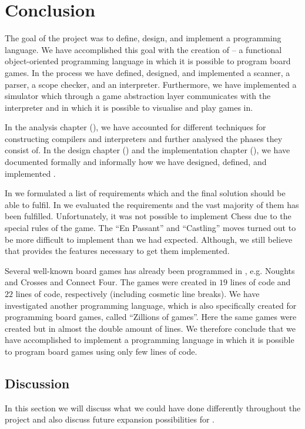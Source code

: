 \chapter{Conclusion}
\label{chap:conclusion}

The goal of the project was to define, design, and implement a programming
language.  We have accomplished this goal with the creation of \productname{} --
a functional object-oriented programming language in which it is possible to
program board games. In the process we have defined, designed, and implemented
a scanner, a parser, a scope checker, and an interpreter. Furthermore, we have
implemented a simulator which through a game abstraction layer communicates with
the interpreter and in which it is possible to visualise and play
\productname{} games in.

In the analysis chapter (), we have accounted for
different techniques for constructing compilers and interpreters and further
analysed the phases they consist of. In the design chapter
() and the implementation chapter
(), we have documented formally and informally how
we have designed, defined, and implemented \productname{}.

In  we formulated a list of requirements which
\productname{} and the final solution should be able to fulfil. In
 we evaluated the requirements and the vast
majority of them has been fulfilled. Unfortunately, it was not possible to
implement Chess due to the special rules of the game. The ``En Passant''
and ``Castling'' moves turned out to be more difficult to implement than we
had expected. Although, we still believe that \productname{} provides the
features necessary to get them implemented.

Several well-known board games has already been programmed in \productname{},
e.g. Noughts and Crosses and Connect Four. The games were created in $19$ lines
of code and $22$ lines of code, respectively (including cosmetic line breaks).
We have investigated another programming language, which is also specifically
created for programming board games, called ``Zillions of games''. Here the same
games were created but in almost the double amount of lines. We therefore
conclude that we have accomplished to implement a programming language in which
it is possible to program board games using only few lines of code.

\section{Discussion}
\label{sec:discussion}

In this section we will discuss what we could have done differently throughout
the project and also discuss future expansion possibilities for \productname{}.

%







